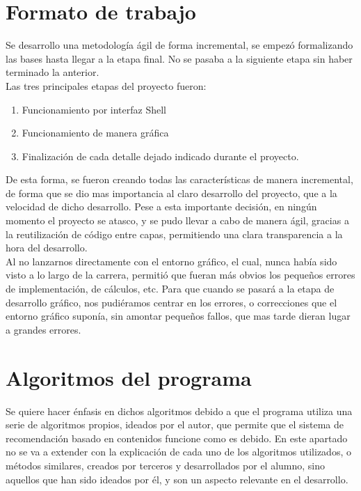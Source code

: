 \section{Formato de trabajo}
Se desarrollo una metodología ágil de forma incremental, se empezó formalizando las bases hasta llegar a la etapa final. No se pasaba a la siguiente etapa sin haber terminado la anterior.\\

Las tres principales etapas del proyecto fueron:
\begin{enumerate}
\item	Funcionamiento por interfaz Shell
\item	Funcionamiento de manera gráfica
\item	Finalización de cada detalle dejado indicado durante el proyecto.
\end{enumerate}

De esta forma, se fueron creando todas las características de manera incremental, de forma que se dio mas importancia al claro desarrollo del proyecto, que a la velocidad de dicho desarrollo. Pese a esta importante decisión, en ningún momento el proyecto se atasco, y se pudo llevar a cabo de manera ágil, gracias a la reutilización de código entre capas, permitiendo una clara transparencia a la hora del desarrollo.\\

Al no lanzarnos directamente con el entorno gráfico, el cual, nunca había sido visto a lo largo de la carrera, permitió que fueran más obvios los pequeños errores de implementación, de cálculos, etc. Para que cuando se pasará a la etapa de desarrollo gráfico, nos pudiéramos centrar en los errores, o correcciones que el entorno gráfico suponía, sin amontar pequeños fallos, que mas tarde dieran lugar a grandes errores.\\

\section{Algoritmos del programa}
Se quiere hacer énfasis en dichos algoritmos debido a que el programa utiliza una serie de algoritmos propios, ideados por el autor, que permite que el sistema de recomendación basado en contenidos funcione como es debido. En este apartado no se va a extender con la explicación de cada uno de los algoritmos utilizados, o métodos similares, creados por terceros y desarrollados por el alumno, sino aquellos que han sido ideados por él, y son un aspecto relevante en el desarrollo.

